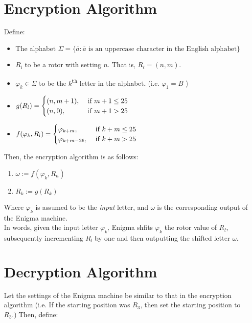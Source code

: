 \documentclass[12pt,a4paper]{article}
\begin{document}
	\section{Encryption Algorithm}
	Define:
		\begin{itemize}
			\item The alphabet $\Sigma = \{\bar{a}: \bar{a} \text{ is an uppercase character in the English alphabet} \}$
			\item $R_l$ to be a rotor with setting $n$. That is, $R_l = (n, m)$.
			\item $\varphi_k \in \Sigma$ to be the $k$\textsuperscript{th} letter in the alphabet. (i.e. $\varphi_1 = B$ )

			\item 
				$g(R_l) = \begin{cases}
					 (n, m+1), & \text{ if }  m+1 \leq 25 \cr
				        (n, 0), & \text{ if } {m+1} > 25 \cr 
				  \end{cases} 
				$
   
			
			\item 
					$f(\varphi_k, R_l) =	\begin{cases} 
						\varphi_{k+m}, & \text{ if } {k+m} \leq 25 \cr
						\varphi_{k+m-26}, & \text{ if }{k+m} > 25 \cr
					\end{cases}
					$ 
		\end{itemize}
	

	Then, the encryption algorithm is as follows:
	
	\begin{enumerate}
		\item $\omega := f(\varphi_k, R_n)$
		\item $R_k := g(R_k)$
	\end{enumerate}

	Where $\varphi_k$ is assumed to be the \emph{input} letter, and $\omega$ is the corresponding output of the Enigma machine. \\
	
	In words, given the input letter $\varphi_k$, Enigma shfits $\varphi_k$ the rotor value of $R_l$, subsequently incrementing $R_l$ by one and then outputting the shifted letter $\omega$.

	\section{Decryption Algorithm}

	\newcommand{\fhat}{\hat{f}}
	Let the settings of the Enigma machine be similar to that in the encryption algorithm (i.e. If the starting position was $R_3$, then set the starting position to $R_3$.) Then, define:
\end{document}
